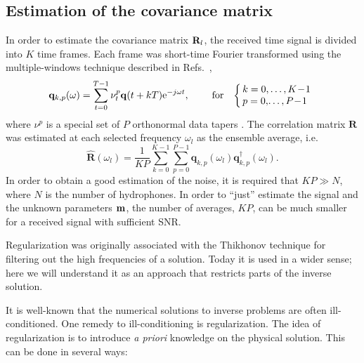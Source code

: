 \documentclass{saclantc}
\begin{document}
\subsection{Estimation of the covariance matrix}
\label{se:cov}
In order to estimate the covariance matrix ${\bf R}_l$, the received
time signal is divided into $K$ time frames. 
Each frame was short-time Fourier transformed using the multiple-windows
technique described in Refs.~\cite{thompson:icassp94,meckl:icassp95},
\begin{equation}
 \label{eq:multiple-win-ft}
 {\mathbf{q}}_{k,p}(\omega) = \sum\limits_{t=0}^{T-1}
      \nu^{p}_t {\mathbf{q}}(t+kT) {\rm e}^{-j\omega t}, \;
 \quad\quad\mbox{for}\quad \!\left\{\begin{array}{l}
       \! \!   k=0,\ldots,K\! - \! 1 \\
       \! \!   p=0, \! \ldots,P\! - \! 1 \\ \end{array} \right. 
\end{equation}
where $\nu^{p}$ is a special set of $P$ orthonormal 
data tapers \cite{thompson:icassp94,meckl:icassp95}.
The correlation matrix $\mathbf{R}$ was estimated at each selected frequency
$\omega_l$ as the ensemble average, i.e.
\begin{equation}
\hat{\mathbf{R}} (\omega_l)=
\frac{1}{KP} \sum_{k=0}^{K-1} \sum_{p=0}^{P-1}
     {\mathbf{q}}_{k,p}(\omega_l) {\mathbf{q}}^\dagger_{k,p}(\omega_l).
\label{eq:R-ensemble-avg}
\end{equation}
In order to obtain a good estimation of the noise, it is required that 
$KP\gg N$, where $N$ is the number of hydrophones. In order to
``just'' estimate the signal and the unknown parameters $\bf m$, the
number of averages, $KP$, can be much smaller for a received signal with
sufficient SNR. 




 \label{se:reg}

Regularization was originally associated with the
Thikhonov technique
for filtering out the high frequencies of a solution. Today it is used in a
wider sense; here we will understand it as an approach that restricts
parts of the inverse solution.

It is well-known that the numerical solutions to inverse problems are
often ill-conditioned. 
One remedy to  ill-conditioning is 
regularization. The idea of regularization is to introduce {\it a priori}
knowledge on the physical solution. This can be done in several ways:
\end{document}
